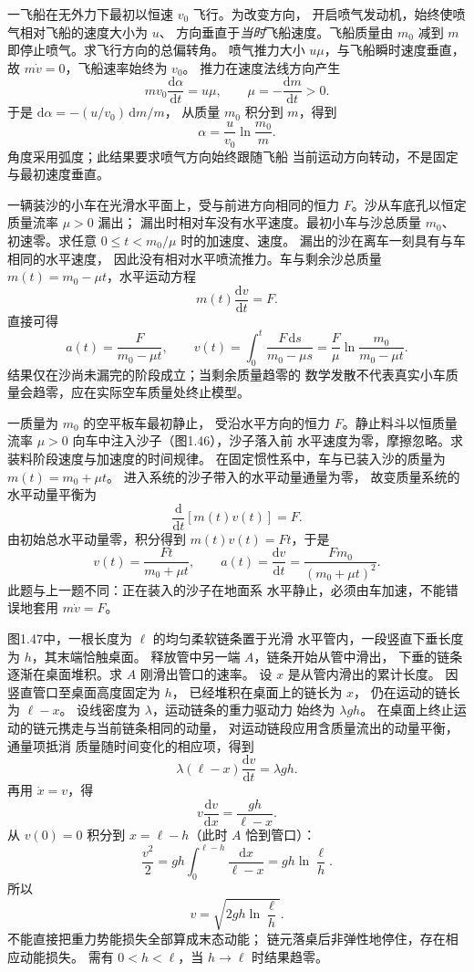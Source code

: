 一飞船在无外力下最初以恒速 $v_0$ 飞行。为改变方向，
开启喷气发动机，始终使喷气相对飞船的速度大小为 $u$、
方向垂直于\emph{当时}飞船速度。飞船质量由 $m_0$ 减到 $m$
即停止喷气。求飞行方向的总偏转角。
\exsolution
喷气推力大小 $u\mu$，与飞船瞬时速度垂直，
故 $m\dot v=0$，飞船速率始终为 $v_0$。
推力在速度法线方向产生
\[
m v_0\frac{\mathrm d\alpha}{\mathrm dt}=u\mu,
\qquad \mu=-\frac{\mathrm dm}{\mathrm dt}>0.
\]
于是 $\mathrm d\alpha=-(u/v_0)\,\mathrm dm/m$，
从质量 $m_0$ 积分到 $m$，得到
\[
\boxed{\alpha=\frac{u}{v_0}\ln\frac{m_0}{m}}.
\]
\excheck 角度采用弧度；此结果要求喷气方向始终跟随飞船
当前运动方向转动，不是固定与最初速度垂直。

一辆装沙的小车在光滑水平面上，受与前进方向相同的恒力
$F$。沙从车底孔以恒定质量流率 $\mu>0$ 漏出；
漏出时相对车没有水平速度。最初小车与沙总质量
$m_0$、初速零。求任意 $0\le t<m_0/\mu$ 时的加速度、速度。
\exsolution
漏出的沙在离车一刻具有与车相同的水平速度，
因此没有相对水平喷流推力。车与剩余沙总质量
$m(t)=m_0-\mu t$，水平运动方程
\[
m(t)\frac{\mathrm dv}{\mathrm dt}=F.
\]
直接可得
\[
\boxed{a(t)=\frac{F}{m_0-\mu t}},\qquad
\boxed{v(t)=\int_0^t\frac{F\,\mathrm ds}{m_0-\mu s}
=\frac F\mu\ln\frac{m_0}{m_0-\mu t}}.
\]
\excheck 结果仅在沙尚未漏完的阶段成立；当剩余质量趋零的
数学发散不代表真实小车质量会趋零，应在实际空车质量处终止模型。

一质量为 $m_0$ 的空平板车最初静止，
受沿水平方向的恒力 $F$。静止料斗以恒质量流率
$\mu>0$ 向车中注入沙子（图1.46），沙子落入前
水平速度为零，摩擦忽略。求装料阶段速度与加速度的时间规律。
\exsolution
在固定惯性系中，车与已装入沙的质量为
$m(t)=m_0+\mu t$。
进入系统的沙子带入的水平动量通量为零，
故变质量系统的水平动量平衡为
\[
\frac{\mathrm d}{\mathrm dt}[m(t)v(t)]=F.
\]
由初始总水平动量零，积分得到
$m(t)v(t)=Ft$，于是
\[
\boxed{v(t)=\frac{Ft}{m_0+\mu t}},\qquad
\boxed{a(t)=\frac{\mathrm dv}{\mathrm dt}
=\frac{Fm_0}{(m_0+\mu t)^2}}.
\]
\excheck 此题与上一题不同：正在装入的沙子在地面系
水平静止，必须由车加速，不能错误地套用 $m\dot v=F$。

图1.47中，一根长度为 $\ell$ 的均匀柔软链条置于光滑
水平管内，一段竖直下垂长度为 $h$，其末端恰触桌面。
释放管中另一端 $A$，链条开始从管中滑出，
下垂的链条逐渐在桌面堆积。求 $A$ 刚滑出管口的速率。
\exsolution
设 $x$ 是从管内滑出的累计长度。
因竖直管口至桌面高度固定为 $h$，
已经堆积在桌面上的链长为 $x$，
仍在运动的链长为 $\ell-x$。
设线密度为 $\lambda$，运动链条的重力驱动力
始终为 $\lambda gh$。
在桌面上终止运动的链元携走与当前链条相同的动量，
对运动链段应用含质量流出的动量平衡，通量项抵消
质量随时间变化的相应项，得到
\[
\lambda(\ell-x)\frac{\mathrm dv}{\mathrm dt}
=\lambda gh .
\]
再用 $\dot x=v$，得
\[
v\frac{\mathrm dv}{\mathrm dx}=\frac{gh}{\ell-x}.
\]
从 $v(0)=0$ 积分到 $x=\ell-h$（此时 $A$ 恰到管口）：
\[
\frac{v^2}{2}
=gh\int_0^{\ell-h}\frac{\mathrm dx}{\ell-x}
=gh\ln\frac{\ell}{h}.
\]
所以
\[
\boxed{v=\sqrt{2gh\ln\frac{\ell}{h}}}.
\]
\excheck 不能直接把重力势能损失全部算成末态动能；
链元落桌后非弹性地停住，存在相应动能损失。
需有 $0<h<\ell$，当 $h\to\ell$ 时结果趋零。


